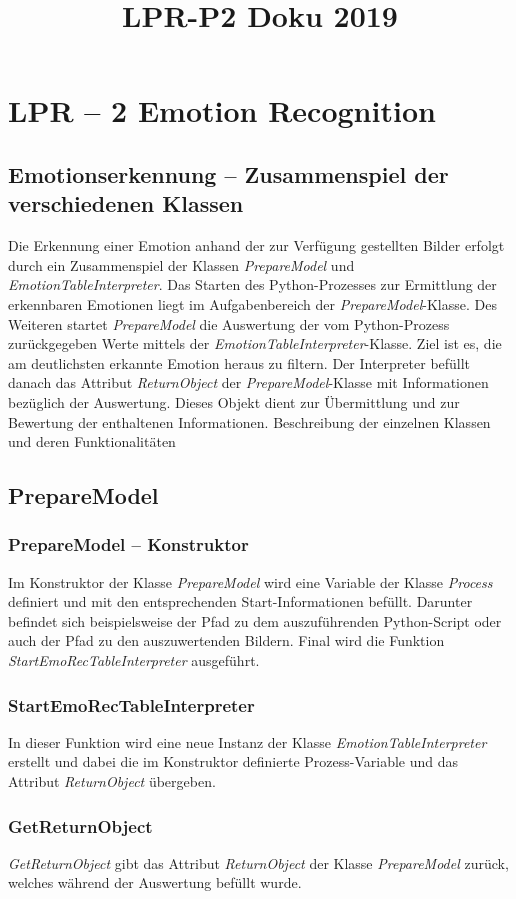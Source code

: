 \documentclass[10pt,a4paper]{report}
\title{LPR-P2 Doku 2019}
\begin{document}
\chapter{LPR – 2 Emotion Recognition}
\section{Emotionserkennung – Zusammenspiel der verschiedenen Klassen}
Die Erkennung einer Emotion anhand der zur Verfügung gestellten Bilder erfolgt durch ein Zusammenspiel der Klassen \textit{PrepareModel} und \textit{EmotionTableInterpreter}. Das Starten des Python-Prozesses zur Ermittlung der erkennbaren Emotionen liegt im Aufgabenbereich der \textit{PrepareModel}-Klasse. Des Weiteren startet \textit{PrepareModel} die Auswertung der vom Python-Prozess zurückgegeben Werte mittels der \textit{EmotionTableInterpreter}-Klasse. Ziel ist es, die am deutlichsten erkannte Emotion heraus zu filtern. Der Interpreter befüllt danach das Attribut \textit{ReturnObject} der \textit{PrepareModel}-Klasse mit Informationen bezüglich der Auswertung. Dieses Objekt dient zur Übermittlung und zur Bewertung der enthaltenen Informationen.
Beschreibung der einzelnen Klassen und deren Funktionalitäten
\section{PrepareModel}
\subsection{PrepareModel – Konstruktor}
Im Konstruktor der Klasse \textit{PrepareModel} wird eine Variable der Klasse \textit{Process} definiert und mit den entsprechenden Start-Informationen befüllt. Darunter befindet sich beispielsweise der Pfad zu dem auszuführenden Python-Script oder auch der Pfad zu den auszuwertenden Bildern. Final wird die Funktion \textit{StartEmoRecTableInterpreter} ausgeführt.
\subsection{StartEmoRecTableInterpreter}
In dieser Funktion wird eine neue Instanz der Klasse \textit{EmotionTableInterpreter} erstellt und dabei die im Konstruktor definierte Prozess-Variable und das Attribut \textit{ReturnObject} übergeben.
\subsection{GetReturnObject}
\textit{GetReturnObject} gibt das Attribut \textit{ReturnObject} der Klasse \textit{PrepareModel} zurück, welches während der Auswertung befüllt wurde. 
\end{document}

